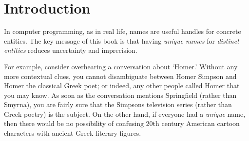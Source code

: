 \chapter{Introduction }

\graphicspath{{img/}{vanilla/img/}{part1/vanilla/img/}}




In computer programming, as in real life, 
names are useful handles for concrete entities.
The key message of this book is that
having \textit{unique names} for
\textit{distinct entities}
reduces uncertainty and imprecision.

For example, consider overhearing a conversation
about `Homer.' Without any more contextual clues, you
cannot disambiguate between Homer Simpson and Homer the
classical Greek poet; or indeed, any other people
called Homer that you may know.
As soon as the conversation mentions Springfield
(rather than Smyrna), you are fairly sure that the
Simpsons television series (rather than Greek poetry)
is the subject.
On the other hand, if everyone had a \textit{unique} name,
then there would be no possibility of confusing 20th century
American cartoon characters with ancient Greek literary figures.

